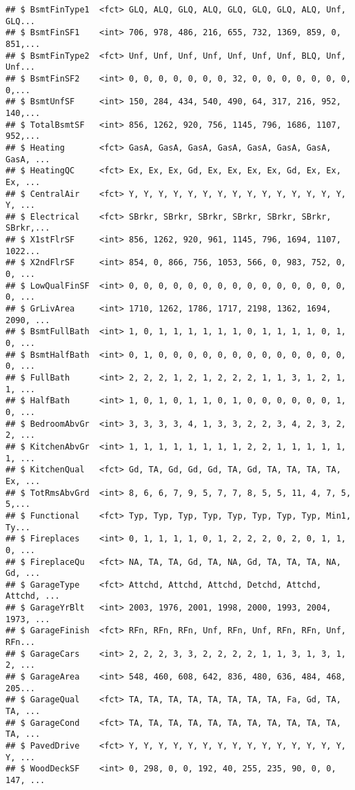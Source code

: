 \documentclass[]{article}
\begin{document}
\begin{verbatim}
## $ BsmtFinType1  <fct> GLQ, ALQ, GLQ, ALQ, GLQ, GLQ, GLQ, ALQ, Unf, GLQ...
## $ BsmtFinSF1    <int> 706, 978, 486, 216, 655, 732, 1369, 859, 0, 851,...
## $ BsmtFinType2  <fct> Unf, Unf, Unf, Unf, Unf, Unf, Unf, BLQ, Unf, Unf...
## $ BsmtFinSF2    <int> 0, 0, 0, 0, 0, 0, 0, 32, 0, 0, 0, 0, 0, 0, 0, 0,...
## $ BsmtUnfSF     <int> 150, 284, 434, 540, 490, 64, 317, 216, 952, 140,...
## $ TotalBsmtSF   <int> 856, 1262, 920, 756, 1145, 796, 1686, 1107, 952,...
## $ Heating       <fct> GasA, GasA, GasA, GasA, GasA, GasA, GasA, GasA, ...
## $ HeatingQC     <fct> Ex, Ex, Ex, Gd, Ex, Ex, Ex, Ex, Gd, Ex, Ex, Ex, ...
## $ CentralAir    <fct> Y, Y, Y, Y, Y, Y, Y, Y, Y, Y, Y, Y, Y, Y, Y, Y, ...
## $ Electrical    <fct> SBrkr, SBrkr, SBrkr, SBrkr, SBrkr, SBrkr, SBrkr,...
## $ X1stFlrSF     <int> 856, 1262, 920, 961, 1145, 796, 1694, 1107, 1022...
## $ X2ndFlrSF     <int> 854, 0, 866, 756, 1053, 566, 0, 983, 752, 0, 0, ...
## $ LowQualFinSF  <int> 0, 0, 0, 0, 0, 0, 0, 0, 0, 0, 0, 0, 0, 0, 0, 0, ...
## $ GrLivArea     <int> 1710, 1262, 1786, 1717, 2198, 1362, 1694, 2090, ...
## $ BsmtFullBath  <int> 1, 0, 1, 1, 1, 1, 1, 1, 0, 1, 1, 1, 1, 0, 1, 0, ...
## $ BsmtHalfBath  <int> 0, 1, 0, 0, 0, 0, 0, 0, 0, 0, 0, 0, 0, 0, 0, 0, ...
## $ FullBath      <int> 2, 2, 2, 1, 2, 1, 2, 2, 2, 1, 1, 3, 1, 2, 1, 1, ...
## $ HalfBath      <int> 1, 0, 1, 0, 1, 1, 0, 1, 0, 0, 0, 0, 0, 0, 1, 0, ...
## $ BedroomAbvGr  <int> 3, 3, 3, 3, 4, 1, 3, 3, 2, 2, 3, 4, 2, 3, 2, 2, ...
## $ KitchenAbvGr  <int> 1, 1, 1, 1, 1, 1, 1, 1, 2, 2, 1, 1, 1, 1, 1, 1, ...
## $ KitchenQual   <fct> Gd, TA, Gd, Gd, Gd, TA, Gd, TA, TA, TA, TA, Ex, ...
## $ TotRmsAbvGrd  <int> 8, 6, 6, 7, 9, 5, 7, 7, 8, 5, 5, 11, 4, 7, 5, 5,...
## $ Functional    <fct> Typ, Typ, Typ, Typ, Typ, Typ, Typ, Typ, Min1, Ty...
## $ Fireplaces    <int> 0, 1, 1, 1, 1, 0, 1, 2, 2, 2, 0, 2, 0, 1, 1, 0, ...
## $ FireplaceQu   <fct> NA, TA, TA, Gd, TA, NA, Gd, TA, TA, TA, NA, Gd, ...
## $ GarageType    <fct> Attchd, Attchd, Attchd, Detchd, Attchd, Attchd, ...
## $ GarageYrBlt   <int> 2003, 1976, 2001, 1998, 2000, 1993, 2004, 1973, ...
## $ GarageFinish  <fct> RFn, RFn, RFn, Unf, RFn, Unf, RFn, RFn, Unf, RFn...
## $ GarageCars    <int> 2, 2, 2, 3, 3, 2, 2, 2, 2, 1, 1, 3, 1, 3, 1, 2, ...
## $ GarageArea    <int> 548, 460, 608, 642, 836, 480, 636, 484, 468, 205...
## $ GarageQual    <fct> TA, TA, TA, TA, TA, TA, TA, TA, Fa, Gd, TA, TA, ...
## $ GarageCond    <fct> TA, TA, TA, TA, TA, TA, TA, TA, TA, TA, TA, TA, ...
## $ PavedDrive    <fct> Y, Y, Y, Y, Y, Y, Y, Y, Y, Y, Y, Y, Y, Y, Y, Y, ...
## $ WoodDeckSF    <int> 0, 298, 0, 0, 192, 40, 255, 235, 90, 0, 0, 147, ...

\end{verbatim}
\end{document}
